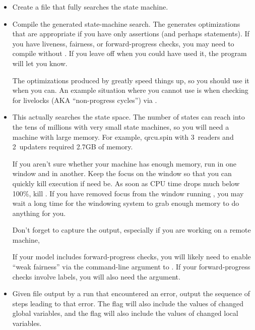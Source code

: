 \begin{itemize}
\item	{}
	Create a file  that fully searches the state machine.
\item	{}
	Compile the generated state-machine search.  The 
	generates optimizations that are appropriate if you have only
	assertions (and perhaps  statements).  If you have
	liveness, fairness, or forward-progress checks, you may need
	to compile without .  If you leave off 
	when you could have used it, the program will let you know.

	The optimizations produced by  greatly speed things
	up, so you should use it when you can.
	An example situation where you cannot use  is
	when checking for livelocks (AKA ``non-progress cycles'')
	via .
\item	{}
	This actually searches the state space.  The number of states
	can reach into the tens of millions with very small state
	machines, so you will need a machine with large memory.
	For example, qrcu.spin with 3~readers and 2~updaters required
	2.7GB of memory.

	If you aren't sure whether your machine has enough memory,
	run  in one window and  in another.  Keep the
	focus on the  window so that you can quickly kill
	execution if need be.  As soon as CPU time drops much below
	100\%, kill .  If you have removed focus from the
	window running , you may wait a long time for the
	windowing system to grab enough memory to do anything for
	you.

	Don't forget to capture the output, especially
	if you are working on a remote machine,

	If your model includes forward-progress checks, you will likely
	need to enable ``weak fairness'' via the  command-line
	argument to .
	If your forward-progress checks involve  labels,
	you will also need the  argument.
\item	{}
	Given  file output by a run that encountered an
	error, output the sequence of steps leading to that error.
	The  flag will also include the values of changed
	global variables, and the   flag will also include
	the values of changed local variables.
\end{itemize}

